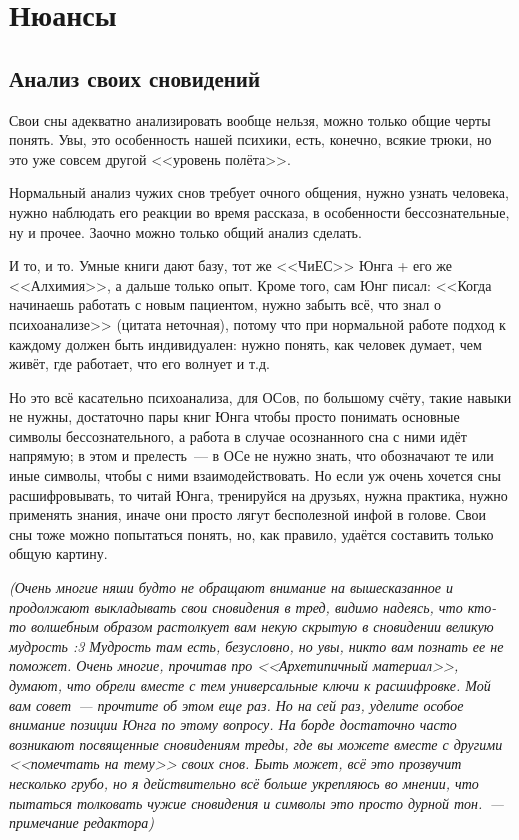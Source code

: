\documentclass[a4paper,14pt,oneside]{memoir}
\begin{document}
\chapter{Нюансы}


\section{Анализ своих сновидений}
Свои сны адекватно анализировать вообще нельзя, можно только общие черты понять. Увы, это особенность нашей психики, есть, конечно, всякие трюки, но это уже совсем другой <<уровень полёта>>.

Нормальный анализ чужих снов требует очного общения, нужно узнать человека, нужно наблюдать его реакции во время рассказа, в особенности бессознательные, ну и прочее. 
Заочно можно только общий анализ сделать.
 
\medskip


\medskip

И то, и то. Умные книги дают базу, тот же <<ЧиЕС>> Юнга + его же <<Алхимия>>, а дальше только опыт. Кроме того, сам Юнг писал: <<Когда начинаешь работать с новым пациентом, нужно забыть всё, что знал о психоанализе>> (цитата неточная), потому что при нормальной работе подход к каждому должен быть индивидуален: нужно понять, как человек думает, чем живёт, где работает, что его волнует и т.д.

Но это всё касательно психоанализа, для ОСов, по большому счёту, такие навыки не нужны, достаточно пары книг Юнга чтобы просто понимать основные символы бессознательного, а работа в случае осознанного сна с ними идёт напрямую; в этом и прелесть~--- в ОСе не нужно знать, что обозначают те или иные символы, чтобы с ними взаимодействовать. Но если уж очень хочется сны расшифровывать, то читай Юнга, тренируйся на друзьях, нужна практика, нужно применять знания, иначе они просто лягут бесполезной инфой в голове. Свои сны тоже можно попытаться понять, но, как правило, удаётся составить только общую картину.

\medskip

\textit{(Очень многие няши будто не обращают внимание на вышесказанное и продолжают выкладывать свои сновидения в тред, видимо надеясь, что кто-то волшебным образом растолкует вам некую скрытую в сновидении великую мудрость :3 Мудрость там есть, безусловно, но увы, никто вам познать ее не поможет. Очень многие, прочитав про <<Архетипичный материал>>, думают, что обрели вместе с тем универсальные ключи к расшифровке. Мой вам совет~--- прочтите об этом еще раз. Но на сей раз, уделите особое внимание позиции Юнга по этому вопросу. На борде достаточно часто возникают посвященные сновидениям треды, где вы можете вместе с другими <<помечтать на тему>> своих снов. Быть может, всё это прозвучит несколько грубо, но я действительно всё больше укрепляюсь во мнении, что пытаться толковать чужие сновидения и символы это просто дурной тон.~--- примечание редактора)}
\end{document}
